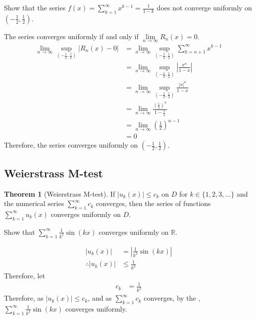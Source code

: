 \documentclass[fleqn, a4paper, 8pt, twoside]{amsart}
\theoremstyle{definition}
\theoremstyle{bluedefinition}
\theoremstyle{redtheorem}
\newtheorem{theorem}{Theorem}
\begin{document}
\begin{multicols}{2}
\begin{spacing}{0.7}
\begin{question}
	Show that the series $f(x) = \sum\limits_{k = 1}^{\infty} x^{k - 1} = \frac{1}{1 - k}$  does not converge uniformly on $\left( -\frac{1}{2} , \frac{1}{2} \right)$.
\end{question}

\begin{solution}
	The series converges uniformly if and only if $\lim\limits_{n \to \infty} R_n(x) = 0$.
	\begin{align*}
		\lim\limits_{n \to \infty} \sup\limits_{\left( -\frac{1}{2} , \frac{1}{2} \right)} |R_n(x) - 0| &= \lim\limits_{n \to \infty} \sup\limits_{\left( -\frac{1}{2} , \frac{1}{2} \right)} \sum\limits_{k = n + 1}^{\infty} x^{k - 1}\\
		&= \lim\limits_{n \to \infty} \sup\limits_{\left( -\frac{1}{2} , \frac{1}{2} \right)} \left| \frac{x^n}{1 - x} \right|\\
		&= \lim\limits_{n \to \infty} \sup\limits_{\left( -\frac{1}{2} , \frac{1}{2} \right)} \frac{|x|^n}{1 - x}\\
		&= \lim\limits_{n \to \infty} \frac{\left( \frac{1}{2} \right)^n}{1 - \frac{1}{2}}\\
		&= \lim\limits_{n \to \infty} \left( \frac{1}{2} \right)^{n - 1}\\
		&= 0
	\end{align*}
	Therefore, the series converges uniformly on $\left( -\frac{1}{2} , \frac{1}{2} \right)$.
\end{solution}

\subsection{Weierstrass M-test}

\begin{theorem}[Weierstrass M-test]
	If $|u_k(x)| \le c_k$ on $D$ for $k \in \{ 1, 2, 3, \dots \}$ and the numerical series $\sum\limits_{k = 1}^{\infty} c_k$ converges, then the series of functions $\sum\limits_{k = 1}^{\infty} u_k(x)$ converges uniformly on $D$.
	\label{Weierstrass_M-test}
\end{theorem}

\begin{question}
	Show that $\sum\limits_{k = 1}^{\infty} \frac{1}{k^2} \sin(k x)$ converges uniformly on $\mathbb{R}$.
\end{question}

\begin{solution}
	\begin{align*}
		|u_k(x)| &= \left| \frac{1}{k^2} \sin(k x) \right|\\
		\therefore |u_k(x)| &\le \frac{1}{k^2}
	\end{align*}
	Therefore, let
	\begin{align*}
		c_k &= \frac{1}{k^2}
	\end{align*}
	Therefore, as $|u_k(x)| \le c_k$, and as $\sum\limits_{k = 1}^{\infty} c_k$ converges, by the , $\sum\limits_{k = 1}^{\infty} \frac{1}{k^2} \sin(k x)$ converges uniformly.
\end{solution}


\end{spacing}
\end{multicols}
\end{document}
